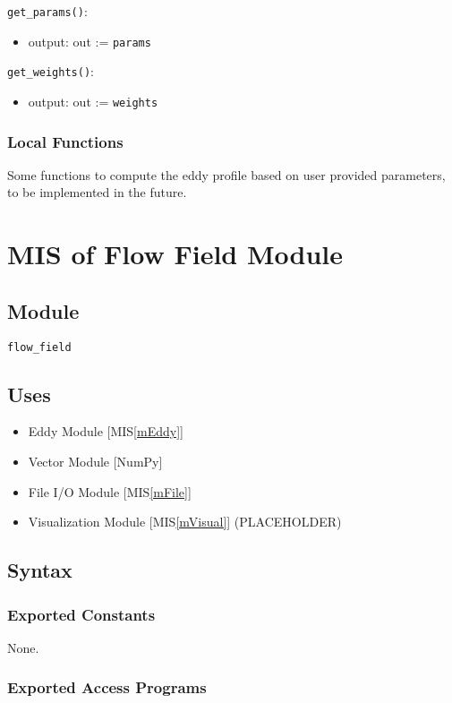 \documentclass[12pt, titlepage]{article}
\begin{document}
\noindent \texttt{get\_params()}:
\begin{itemize}
\item output: out := \texttt{params}
\end{itemize}

\noindent \texttt{get\_weights()}:
\begin{itemize}
\item output: out := \texttt{weights}
\end{itemize}

\subsubsection{Local Functions}
Some functions to compute the eddy profile based on user provided parameters, to be implemented in the future.



\newpage
\section{MIS of Flow Field Module} \label{mFlow} 

\subsection{Module}
\texttt{flow\_field}

\subsection{Uses}
\begin{itemize}
\item Eddy Module [MIS\ref{mEddy}]
\item Vector Module [NumPy]
\item File I/O Module [MIS\ref{mFile}]
\item Visualization Module [MIS\ref{mVisual}] (PLACEHOLDER)
\end{itemize}

\subsection{Syntax}

\subsubsection{Exported Constants}
None.

\subsubsection{Exported Access Programs}
\end{document}
